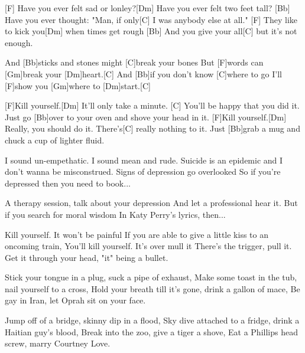 

\begin{guitar}
	[F] Have you ever felt sad or lonley?[Dm] Have you ever felt two feet tall?
	[Bb] Have you ever thought: "Man, if only[C] I was anybody else at all."
	[F] They like to kick you[Dm] when times get rough
	[Bb] And you give your all[C] but it's not enough.
	
	And [Bb]sticks and stones might [C]break your bones
	But [F]words can [Gm]break your [Dm]heart.[C]{}
	And [Bb]if you don't know [C]where to go
	I'll [F]show you [Gm]where to [Dm]start.[C]{}
	
	[F]Kill yourself.[Dm] It'll only take a minute.
	[C] You'll be happy that you did it. Just go [Bb]over to your oven and shove your head in it.
	[F]Kill yourself.[Dm] Really, you should do it.
	There's[C] really nothing to it. Just [Bb]grab a mug and chuck a cup of lighter fluid.
	
	I sound un-empethatic. I sound mean and rude.
	Suicide is an epidemic and I don't wanna be misconstrued.
	Signs of depression go overlooked
	So if you're depressed then you need to book...
	
	A therapy session, talk about your depression
	And let a professional hear it.
	But if you search for moral wisdom
	In Katy Perry's lyrics, then...
	
	\pagebreak
	
	Kill yourself. It won't be painful
	If you are able to give a little kiss to an oncoming train,
	You'll kill yourself. It's over mull it
	There's the trigger, pull it. Get it through your head, "it" being a bullet.
	
	Stick your tongue in a plug, suck a pipe of exhaust,
	Make some toast in the tub, nail yourself to a cross,
	Hold your breath till it's gone, drink a gallon of mace,
	Be gay in Iran, let Oprah sit on your face.
	
	Jump off of a bridge, skinny dip in a flood,
	Sky dive attached to a fridge, drink a Haitian guy's blood,
	Break into the zoo, give a tiger a shove,
	Eat a Phillips head screw, marry Courtney Love.
\end{guitar}

